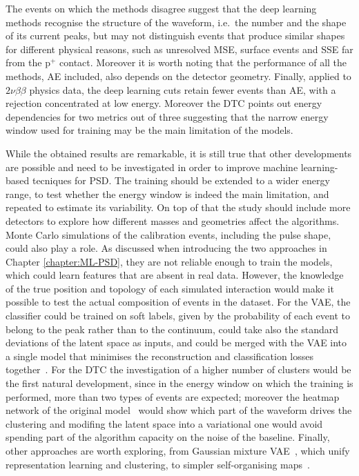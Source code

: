 The events on which the methods disagree suggest that the deep learning methods recognise the structure of the waveform, i.e.\ the number and the shape of its current peaks, but may not distinguish events that produce similar shapes for different physical reasons, such as unresolved \ac{MSE}, surface events and \ac{SSE} far from the p$^+$ contact. Moreover it is worth noting that the performance of all the methods, \ac{AE} included, also depends on the detector geometry. Finally, applied to $2\nu\beta\beta$ physics data, the deep learning cuts retain fewer events than \ac{AE}, with a rejection concentrated at low energy. Moreover the \ac{DTC} points out energy dependencies for two metrics out of three suggesting that the narrow energy window used for training may be the main limitation of the models.

While the obtained results are remarkable, it is still true that other developments are possible and need to be investigated in order to improve machine learning-based tecniques for \ac{PSD}. The training should be extended to a wider energy range, to test whether the energy window is indeed the main limitation, and repeated to estimate its variability. On top of that the study should include more detectors to explore how different masses and geometries affect the algorithms. Monte Carlo simulations of the calibration events, including the pulse shape, could also play a role. As discussed when introducing the two approaches in Chapter \ref{chapter:ML-PSD}, they are not reliable enough to train the models, which could learn features that are absent in real data. However, the knowledge of the true position and topology of each simulated interaction would make it possible to test the actual composition of events in the dataset. For the \ac{VAE}, the classifier could be trained on soft labels, given by the probability of each event to belong to the peak rather than to the continuum, could take also the standard deviations of the latent space as inputs, and could be merged with the \ac{VAE} into a single model that minimises the reconstruction and classification losses together~\cite{kingma2014semi}. For the \ac{DTC} the investigation of a higher number of clusters would be the first natural development, since in the energy window on which the training is performed, more than two types of events are expected; moreover the heatmap network of the original model~\cite{DTC} would show which part of the waveform drives the clustering and modifing the latent space into a variational one would avoid spending part of the algorithm capacity on the noise of the baseline. Finally, other approaches are worth exploring, from Gaussian mixture \ac{VAE}~\cite{gmvae}, which unify representation learning and clustering, to simpler self-organising maps~\cite{kohonen1982}.



